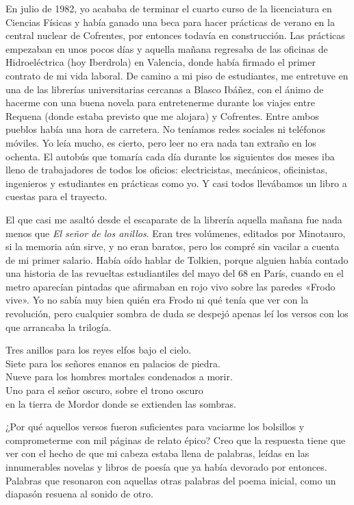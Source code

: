 \label{cap:intro}

En julio de 1982, yo acababa de terminar el cuarto curso de la licenciatura en Ciencias Físicas y había ganado una beca para hacer prácticas de verano en la central nuclear de Cofrentes, por entonces todavía en construcción. Las prácticas empezaban en unos pocos días y aquella mañana regresaba de las oficinas de Hidroeléctrica (hoy Iberdrola) en Valencia, donde había firmado el primer contrato de mi vida laboral. De camino a mi piso de estudiantes, me entretuve en una de las librerías universitarias cercanas a Blasco Ibáñez, con el ánimo de hacerme con una buena novela para entretenerme durante los viajes entre Requena (donde estaba previsto que me alojara) y Cofrentes. Entre ambos pueblos había una hora de carretera. No teníamos redes sociales ni teléfonos móviles. Yo leía mucho, es cierto, pero leer no era nada tan extraño en los ochenta. El autobús que tomaría cada día durante los siguientes dos meses iba lleno de trabajadores de todos los oficios: electricistas, mecánicos, oficinistas, ingenieros y estudiantes en prácticas como yo. Y casi todos llevábamos un libro a cuestas para el trayecto.

El que casi me asaltó desde el escaparate de la librería aquella mañana fue nada menos que \emph{El señor de los anillos}. Eran tres volúmenes, editados por Minotauro, si la memoria aún sirve, y no eran baratos, pero los compré sin vacilar a cuenta de mi primer salario. Había oído hablar de Tolkien, porque alguien había contado una historia de las revueltas estudiantiles del mayo del 68 en París, cuando en el metro aparecían pintadas que afirmaban en rojo vivo sobre las paredes «Frodo vive». Yo no sabía muy bien quién era Frodo ni qué tenía que ver con la revolución, pero cualquier sombra de duda se despejó apenas leí los versos con los que arrancaba la trilogía.

\begin{versocita}
Tres anillos para los reyes elfos bajo el cielo.\\
Siete para los señores enanos en palacios de piedra.\\
Nueve para los hombres mortales condenados a morir.\\
Uno para el señor oscuro, sobre el trono oscuro\\
en la tierra de Mordor donde se extienden las sombras.
\end{versocita}

¿Por qué aquellos versos fueron suficientes para vaciarme los bolsillos y comprometerme con mil páginas de relato épico? Creo que la respuesta tiene que ver con el hecho de que mi cabeza estaba llena de palabras, leídas en las innumerables novelas y libros de poesía que ya había devorado por entonces. Palabras que resonaron con aquellas otras palabras del poema inicial, como un diapasón resuena al sonido de otro.

